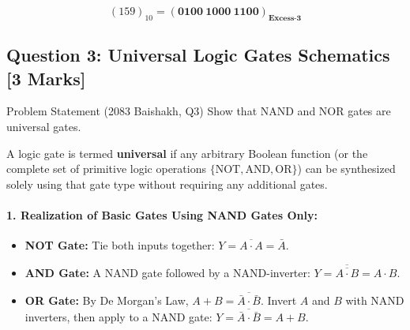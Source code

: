 \documentclass[11pt,a4paper,oneside]{book}
\begin{document}
\begin{answerbox}
$$(159)_{10} = \mathbf{(0100\ 1000\ 1100)_{\text{Excess-3}}}$$
\end{answerbox}

\vspace{0.6cm}

\subsection{Question 3: Universal Logic Gates Schematics [3 Marks]}
\begin{questionbox}{Problem Statement (2083 Baishakh, Q3)}
Show that NAND and NOR gates are universal gates.
\end{questionbox}

A logic gate is termed \textbf{universal} if any arbitrary Boolean function (or the complete set of primitive logic operations $\{\text{NOT}, \text{AND}, \text{OR}\}$) can be synthesized solely using that gate type without requiring any additional gates.

\paragraph{1. Realization of Basic Gates Using NAND Gates Only:}
\begin{itemize}
  \item \textbf{NOT Gate:} Tie both inputs together: $Y = \overline{A \cdot A} = \bar{A}$.
  \item \textbf{AND Gate:} A NAND gate followed by a NAND-inverter: $Y = \overline{\overline{A \cdot B}} = A \cdot B$.
  \item \textbf{OR Gate:} By De Morgan's Law, $A + B = \overline{\bar{A} \cdot \bar{B}}$. Invert $A$ and $B$ with NAND inverters, then apply to a NAND gate: $Y = \overline{\bar{A} \cdot \bar{B}} = A + B$.
\end{itemize}
\end{document}
